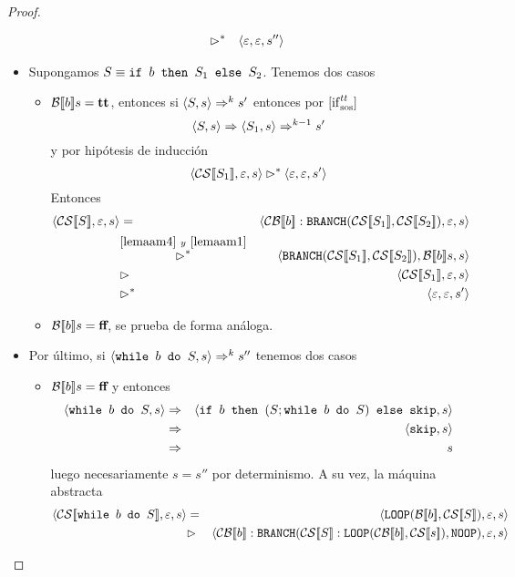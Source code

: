 \begin{lema}
\begin{proof}
\begin{itemize}
\begin{eqnarray*}
        &\rhd^*&  \langle \varepsilon, \varepsilon, s'' \rangle
    \end{eqnarray*}
    \item Supongamos $S \equiv \texttt{if } b \texttt{ then } S_1 \texttt{ else } S_2$. Tenemos dos casos
    \begin{itemize}
        \item $\mathcal{B}[\![b]\!]s = \textbf{tt}$, entonces si $\langle S, s \rangle\Rightarrow^k s'$ entonces por $[\mathrm{if}_{\mathrm{sos}}^{tt}]$
        \[
            \langle S, s \rangle \Rightarrow \langle S_1, s \rangle \Rightarrow^{k-1} s'
        \]
        y por hipótesis de inducción
        \[
            \langle \mathcal{CS}[\![S_1]\!], \varepsilon, s \rangle \rhd^* \langle \varepsilon, \varepsilon, s' \rangle
        \]
        Entonces
        \begin{eqnarray*}
            \conf{\fc{CS}{S}}{\varepsilon}{s} &=& \conf{\fc{CB}{b}:\n{BRANCH}(\fc{CS}{S_1}, \fc{CS}{S_2})}{\varepsilon}{s} \\
            &\overset{\ref{lemaam4}\ y\ \ref{lemaam1}}{\rhd^*}& \conf{\n{BRANCH}(\fc{CS}{S_1}, \fc{CS}{S_2})}{\fc{B}{b}s}{s} \\
            &\rhd& \conf{\fc{CS}{S_1}}{\varepsilon}{s} \\
            &\rhd^*& \conf{\varepsilon}{\varepsilon}{s'} \\
        \end{eqnarray*}
        \item $\mathcal{B}[\![b]\!]s = \textbf{ff}$, se prueba de forma análoga.
    \end{itemize}
    \item Por último, si $\langle \texttt{while } b \texttt{ do } S, s \rangle \Rightarrow^k s''$ tenemos dos casos
    \begin{itemize}
        \item $\mathcal{B}[\![b]\!]s = \textbf{ff}$ y entonces
            \begin{eqnarray*}
                \langle \texttt{while } b \texttt{ do } S, s \rangle &\Rightarrow& \langle \texttt{if } b \texttt{ then } (S; \texttt{while } b \texttt{ do } S) \texttt{ else } \texttt{skip}, s \rangle \\
                &\Rightarrow& \langle \texttt{skip}, s \rangle \\
                &\Rightarrow& s
            \end{eqnarray*}
            luego necesariamente $s = s''$ por determinismo. A su vez, la máquina abstracta 
            \begin{eqnarray*}
                \conf{\fc{CS}{\nwhile b \ndo S}}{\varepsilon}{s} &=& \conf{\n{LOOP}(\fc{B}{b}, \fc{CS}{S})}{\varepsilon}{s} \\
                &\rhd&  \conf{\fc{CB}{b}:\n{BRANCH}(\fc{CS}{S}:\n{LOOP}(\fc{CB}{b}, \fc{CS}{s}), \n{NOOP})}{\varepsilon}{s} \\

\end{eqnarray*}
\end{itemize}
\end{itemize}
\end{proof}
\end{lema}
